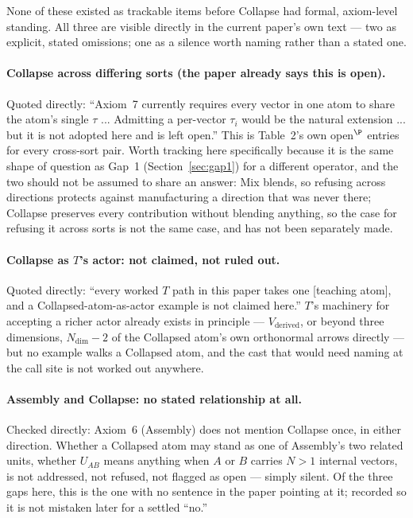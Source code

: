 \documentclass[11pt]{article}
\begin{document}
None of these existed as trackable items before Collapse had formal,
axiom-level standing. All three are visible directly in the current
paper's own text --- two as explicit, stated omissions; one as a
silence worth naming rather than a stated one.

\paragraph{Collapse across differing sorts (the paper already says
this is open).} Quoted directly: ``Axiom~7 currently requires every
vector in one atom to share the atom's single $\tau$ ... Admitting a
per-vector $\tau_i$ would be the natural extension ... but it is not
adopted here and is left open.'' This is Table~2's own open$^\P$
entries for every cross-sort pair. Worth tracking here specifically
because it is the same shape of question as Gap~1
(Section~\ref{sec:gap1}) for a different operator, and the two should
not be assumed to share an answer: Mix blends, so refusing across
directions protects against manufacturing a direction that was never
there; Collapse preserves every contribution without blending
anything, so the case for refusing it across sorts is not the same
case, and has not been separately made.

\paragraph{Collapse as $T$'s actor: not claimed, not ruled out.}
Quoted directly: ``every worked $T$ path in this paper takes one
[teaching atom], and a Collapsed-atom-as-actor example is not claimed
here.'' $T$'s machinery for accepting a richer actor already exists in
principle --- $V_{\text{derived}}$, or beyond three dimensions,
$N_{\text{dim}}-2$ of the Collapsed atom's own orthonormal arrows
directly --- but no example walks a Collapsed atom, and the cast that
would need naming at the call site is not worked out anywhere.

\paragraph{Assembly and Collapse: no stated relationship at all.}
Checked directly: Axiom~6 (Assembly) does not mention Collapse once,
in either direction. Whether a Collapsed atom may stand as one of
Assembly's two related units, whether $U_{AB}$ means anything when $A$
or $B$ carries $N>1$ internal vectors, is not addressed, not refused,
not flagged as open --- simply silent. Of the three gaps here, this is
the one with no sentence in the paper pointing at it; recorded so it
is not mistaken later for a settled ``no.''
\end{document}
